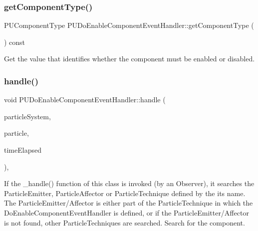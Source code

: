 \subsubsection{\texorpdfstring{get\+Component\+Type()}{getComponentType()}\hspace{0.1cm}{\footnotesize\ttfamily [2/2]}}
{\footnotesize\ttfamily P\+U\+Component\+Type P\+U\+Do\+Enable\+Component\+Event\+Handler\+::get\+Component\+Type (\begin{DoxyParamCaption}\item[{void}]{ }\end{DoxyParamCaption}) const\hspace{0.3cm}{\ttfamily [inline]}}

Get the value that identifies whether the component must be enabled or disabled. \mbox{\label{classPUDoEnableComponentEventHandler_a1c27b9000122f25304629fd2487c6e50}} 
\subsubsection{\texorpdfstring{handle()}{handle()}\hspace{0.1cm}{\footnotesize\ttfamily [1/2]}}
{\footnotesize\ttfamily void P\+U\+Do\+Enable\+Component\+Event\+Handler\+::handle (\begin{DoxyParamCaption}\item[{\hyperlink{classPUParticleSystem3D}{P\+U\+Particle\+System3D} $\ast$}]{particle\+System,  }\item[{\hyperlink{structPUParticle3D}{P\+U\+Particle3D} $\ast$}]{particle,  }\item[{float}]{time\+Elapsed }\end{DoxyParamCaption})\hspace{0.3cm}{\ttfamily [override]}, {\ttfamily [virtual]}}

If the \+\_\+handle() function of this class is invoked (by an Observer), it searches the Particle\+Emitter, Particle\+Affector or Particle\+Technique defined by the its name. The Particle\+Emitter/\+Affector is either part of the Particle\+Technique in which the Do\+Enable\+Component\+Event\+Handler is defined, or if the Particle\+Emitter/\+Affector is not found, other Particle\+Techniques are searched. Search for the component.

